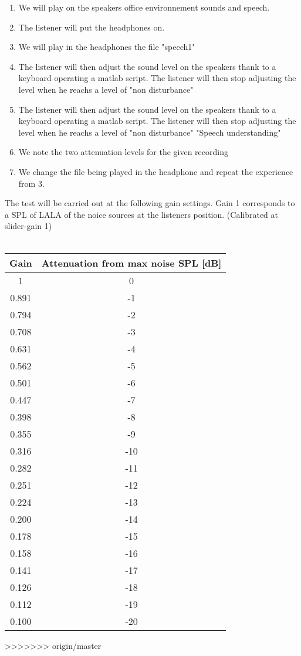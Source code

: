 \begin{enumerate}


\item We will play on the speakers office environnement sounds and speech. 
\item The listener will put the headphones on.
\item We will play in the headphones the file "speech1"
\item The listener will then adjust the sound level on the speakers thank to a keyboard operating a matlab script. The listener will then stop adjusting the level when he reachs a level of "non disturbance"
\item The listener will then adjust the sound level on the speakers thank to a keyboard operating a matlab script. The listener will then stop adjusting the level when he reachs a level of "non disturbance" "Speech understanding"
\item We note the two attenuation levels for the given recording
\item We change the file being played in the headphone and repeat the experience from 3.
\end{enumerate}
\noindent
The test will be carried out at the following gain settings. Gain 1 corresponds to a SPL of LALA of the noice sources at the listeners position. (Calibrated at slider-gain 1) \\\\
\begin{tabular}{c | c} \toprule 
Gain & Attenuation from max noise SPL [dB]  \\ \toprule
1 		& 0   \\
0.891 	& -1  \\
0.794	& -2  \\
0.708	& -3  \\
0.631	& -4  \\
0.562	& -5  \\
0.501	& -6  \\
0.447	& -7  \\
0.398	& -8  \\
0.355	& -9  \\
0.316	& -10 \\
0.282 	& -11  \\
0.251	& -12  \\
0.224	& -13  \\
0.200	& -14  \\
0.178	& -15  \\
0.158	& -16  \\
0.141	& -17  \\
0.126	& -18  \\
0.112	& -19  \\
0.100	& -20 \\ \bottomrule

\end{tabular}
>>>>>>> origin/master

